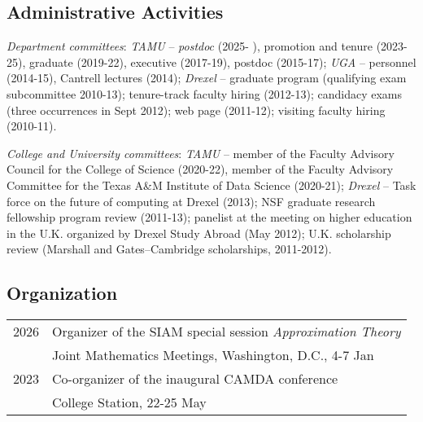 \documentclass[11pt]{article}
\begin{document}
\subsection{Administrative Activities}
\bitemize
\item {\sl Department committees}:  
{\sl TAMU} -- {\sl postdoc} (2025- ), promotion and tenure (2023-25), 
graduate (2019-22), executive (2017-19), postdoc (2015-17);
{\sl UGA} -- personnel (2014-15), Cantrell lectures (2014); 
{\sl Drexel} -- 
graduate program (qualifying exam subcommittee 2010-13);
tenure-track faculty hiring (2012-13); 
candidacy exams (three occurrences in Sept 2012);
web page (2011-12);
visiting faculty hiring (2010-11).
\item {\sl College and University committees}: 
{\sl TAMU} -- 
member of the Faculty Advisory Council for the College of Science (2020-22),
member of the Faculty Advisory Committee for the Texas A\&M Institute of Data Science (2020-21);
{\sl Drexel} -- 
Task force on the future of computing at Drexel (2013);
NSF graduate research fellowship program review (2011-13);
panelist at the meeting on higher education in the U.K. organized by Drexel Study Abroad (May 2012); 
U.K. scholarship review  (Marshall and Gates--Cambridge scholarships, 2011-2012).
\eitemize 
 

\subsection{Organization}

\begin{tabular}{ll}
2026\phantom{-??} & Organizer of the SIAM special session {\em Approximation Theory}\\
& Joint Mathematics Meetings, Washington, D.C., 4-7 Jan\\
2023 & Co-organizer of the inaugural CAMDA conference\\
& College Station, 22-25 May
\end{tabular}
\end{document}
